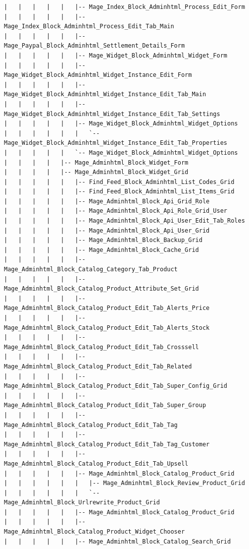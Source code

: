 \documentclass[oneside]{book}
\begin{document}
\begin{lstlisting}
|   |   |   |   |   |-- Mage_Index_Block_Adminhtml_Process_Edit_Form
|   |   |   |   |   |-- Mage_Index_Block_Adminhtml_Process_Edit_Tab_Main
|   |   |   |   |   |-- Mage_Paypal_Block_Adminhtml_Settlement_Details_Form
|   |   |   |   |   |-- Mage_Widget_Block_Adminhtml_Widget_Form
|   |   |   |   |   |-- Mage_Widget_Block_Adminhtml_Widget_Instance_Edit_Form
|   |   |   |   |   |-- Mage_Widget_Block_Adminhtml_Widget_Instance_Edit_Tab_Main
|   |   |   |   |   |-- Mage_Widget_Block_Adminhtml_Widget_Instance_Edit_Tab_Settings
|   |   |   |   |   |-- Mage_Widget_Block_Adminhtml_Widget_Options
|   |   |   |   |   |   `-- Mage_Widget_Block_Adminhtml_Widget_Instance_Edit_Tab_Properties
|   |   |   |   |   `-- Mage_Widget_Block_Adminhtml_Widget_Options
|   |   |   |   |-- Mage_Adminhtml_Block_Widget_Form
|   |   |   |   |-- Mage_Adminhtml_Block_Widget_Grid
|   |   |   |   |   |-- Find_Feed_Block_Adminhtml_List_Codes_Grid
|   |   |   |   |   |-- Find_Feed_Block_Adminhtml_List_Items_Grid
|   |   |   |   |   |-- Mage_Adminhtml_Block_Api_Grid_Role
|   |   |   |   |   |-- Mage_Adminhtml_Block_Api_Role_Grid_User
|   |   |   |   |   |-- Mage_Adminhtml_Block_Api_User_Edit_Tab_Roles
|   |   |   |   |   |-- Mage_Adminhtml_Block_Api_User_Grid
|   |   |   |   |   |-- Mage_Adminhtml_Block_Backup_Grid
|   |   |   |   |   |-- Mage_Adminhtml_Block_Cache_Grid
|   |   |   |   |   |-- Mage_Adminhtml_Block_Catalog_Category_Tab_Product
|   |   |   |   |   |-- Mage_Adminhtml_Block_Catalog_Product_Attribute_Set_Grid
|   |   |   |   |   |-- Mage_Adminhtml_Block_Catalog_Product_Edit_Tab_Alerts_Price
|   |   |   |   |   |-- Mage_Adminhtml_Block_Catalog_Product_Edit_Tab_Alerts_Stock
|   |   |   |   |   |-- Mage_Adminhtml_Block_Catalog_Product_Edit_Tab_Crosssell
|   |   |   |   |   |-- Mage_Adminhtml_Block_Catalog_Product_Edit_Tab_Related
|   |   |   |   |   |-- Mage_Adminhtml_Block_Catalog_Product_Edit_Tab_Super_Config_Grid
|   |   |   |   |   |-- Mage_Adminhtml_Block_Catalog_Product_Edit_Tab_Super_Group
|   |   |   |   |   |-- Mage_Adminhtml_Block_Catalog_Product_Edit_Tab_Tag
|   |   |   |   |   |-- Mage_Adminhtml_Block_Catalog_Product_Edit_Tab_Tag_Customer
|   |   |   |   |   |-- Mage_Adminhtml_Block_Catalog_Product_Edit_Tab_Upsell
|   |   |   |   |   |-- Mage_Adminhtml_Block_Catalog_Product_Grid
|   |   |   |   |   |   |-- Mage_Adminhtml_Block_Review_Product_Grid
|   |   |   |   |   |   `-- Mage_Adminhtml_Block_Urlrewrite_Product_Grid
|   |   |   |   |   |-- Mage_Adminhtml_Block_Catalog_Product_Grid
|   |   |   |   |   |-- Mage_Adminhtml_Block_Catalog_Product_Widget_Chooser
|   |   |   |   |   |-- Mage_Adminhtml_Block_Catalog_Search_Grid

\end{lstlisting}
\end{document}
